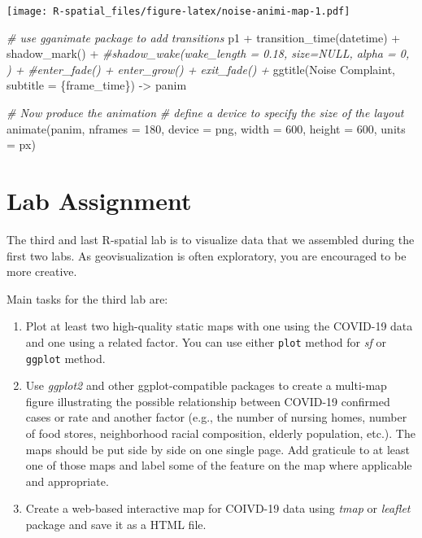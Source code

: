 \documentclass[
  11pt,
]{book}
\newenvironment{Shaded}{\begin{snugshade}}{\end{snugshade}}
\newcommand{\AttributeTok}[1]{\textcolor[rgb]{0.77,0.63,0.00}{#1}}
\newcommand{\CommentTok}[1]{\textcolor[rgb]{0.56,0.35,0.01}{\textit{#1}}}
\newcommand{\DecValTok}[1]{\textcolor[rgb]{0.00,0.00,0.81}{#1}}
\newcommand{\FunctionTok}[1]{\textcolor[rgb]{0.00,0.00,0.00}{#1}}
\newcommand{\NormalTok}[1]{#1}
\newcommand{\OtherTok}[1]{\textcolor[rgb]{0.56,0.35,0.01}{#1}}
\newcommand{\SpecialCharTok}[1]{\textcolor[rgb]{0.00,0.00,0.00}{#1}}
\newcommand{\StringTok}[1]{\textcolor[rgb]{0.31,0.60,0.02}{#1}}
\providecommand{\tightlist}{%
  \setlength{\itemsep}{0pt}\setlength{\parskip}{0pt}}
\begin{document}
\texttt{[image: R-spatial\_files/figure-latex/noise-animi-map-1.pdf]}

\begin{Shaded}
\begin{Highlighting}[]
\CommentTok{\# use gganimate package to add transitions    }
\NormalTok{p1 }\SpecialCharTok{+} \FunctionTok{transition\_time}\NormalTok{(datetime) }\SpecialCharTok{+}
  \FunctionTok{shadow\_mark}\NormalTok{() }\SpecialCharTok{+}
  \CommentTok{\#shadow\_wake(wake\_length = 0.18, size=NULL, alpha = 0, ) +}
  \CommentTok{\#enter\_fade() + enter\_grow() + exit\_fade() +}
  \FunctionTok{ggtitle}\NormalTok{(}\StringTok{\textquotesingle{}Noise Complaint\textquotesingle{}}\NormalTok{, }\AttributeTok{subtitle =} \StringTok{\textquotesingle{}\{frame\_time\}\textquotesingle{}}\NormalTok{) }\OtherTok{{-}\textgreater{}}\NormalTok{ panim}

\CommentTok{\# Now produce the animation}
\CommentTok{\# define a device to specify the size of the layout}
\FunctionTok{animate}\NormalTok{(panim, }\AttributeTok{nframes =} \DecValTok{180}\NormalTok{, }
        \AttributeTok{device =} \StringTok{\textquotesingle{}png\textquotesingle{}}\NormalTok{, }\AttributeTok{width =} \DecValTok{600}\NormalTok{, }\AttributeTok{height =} \DecValTok{600}\NormalTok{, }\AttributeTok{units =} \StringTok{\textquotesingle{}px\textquotesingle{}}\NormalTok{)}
\end{Highlighting}
\end{Shaded}

\hypertarget{lab-assignment-2}{%
\section{Lab Assignment}\label{lab-assignment-2}}

The third and last R-spatial lab is to visualize data that we assembled during the first two labs. As geovisualization is often exploratory, you are encouraged to be more creative.

Main tasks for the third lab are:

\begin{enumerate}
\def\labelenumi{\arabic{enumi}.}
\tightlist
\item
  Plot at least two high-quality static maps with one using the COVID-19 data and one using a related factor. You can use either \texttt{plot} method for \emph{sf} or \texttt{ggplot} method.\\
\item
  Use \emph{ggplot2} and other ggplot-compatible packages to create a multi-map figure illustrating the possible relationship between COVID-19 confirmed cases or rate and another factor (e.g., the number of nursing homes, number of food stores, neighborhood racial composition, elderly population, etc.). The maps should be put side by side on one single page. Add graticule to at least one of those maps and label some of the feature on the map where applicable and appropriate.
\item
  Create a web-based interactive map for COIVD-19 data using \emph{tmap} or \emph{leaflet} package and save it as a HTML file.
\end{enumerate}
\end{document}
